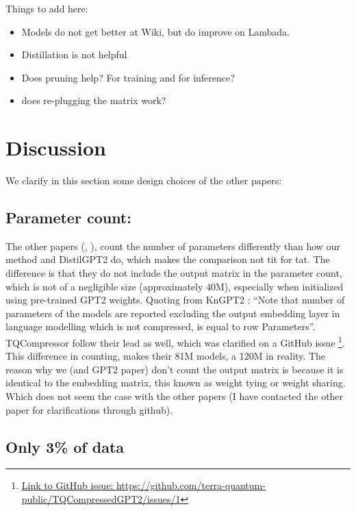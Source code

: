 \documentclass{article}
\begin{document}
{Things to add here:

\begin{itemize}
	\item Models do not get better at Wiki, but do improve on Lambada.
	\item Distillation is not helpful 
	\item Does pruning help? For training and for inference?
	\item does re-plugging the matrix work? 
\end{itemize}

\section{Discussion}%
\label{sec:Discussion}

We clarify in this section some design choices of the other papers:

\subsection{Parameter count:}%
\label{sub:Parameter count:}

The other papers (\cite{tahaei2022kroneckerbert}, \cite{abronin2024tqcompressor}), count the number of parameters differently than how our method and DistilGPT2 do, which makes the comparison not tit for tat. The difference is that they do not include the output matrix in the parameter count, which is not of a negligible size (approximately 40M), especially when initialized using pre-trained GPT2 weights. Quoting from KnGPT2 \cite{tahaei2022kroneckerbert}: ``Note that number of parameters of the models are reported excluding the output embedding layer in language modelling which is not compressed, is equal to row Parameters''. TQCompressor \cite{abronin2024tqcompressor} follow their lead as well, which was clarified on a GitHub issue \footnote{\href{https://github.com/terra-quantum-public/TQCompressedGPT2/issues/1}{Link to GitHub issue: https://github.com/terra-quantum-public/TQCompressedGPT2/issues/1}}.
This difference in counting, makes their 81M models, a 120M in reality. The reason why we (and GPT2 paper) don't count the output matrix is because it is identical to the embedding matrix, this known as weight tying or weight sharing. Which does not seem the case with the other papers (I have contacted the other paper for clarifications through github).

\subsection{Only 3\% of data}%
\label{sub:Only 3\% of data}

}
\end{document}
